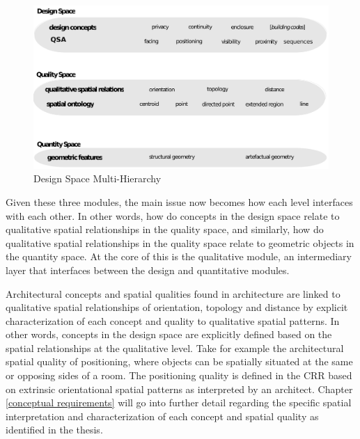 \documentclass[12pt]{ucthesis}
\begin{document}
\begin{figure}[t]
\centering
\includegraphics[width=140mm]{spatial-qualities-hierarchy-nolinks}
\caption{Design Space Multi-Hierarchy}
\label{hierarchy no-links}
\end{figure}

Given these three modules, the main issue now becomes how each level interfaces with each other. In other words, how do concepts in the design space relate to qualitative spatial relationships in the quality space, and similarly, how do qualitative spatial relationships in the quality space relate to geometric objects in the quantity space. At the core of this is the qualitative module, an intermediary layer that interfaces between the design and quantitative modules. 

Architectural concepts and spatial qualities found in architecture are linked to qualitative spatial relationships of orientation, topology and distance by explicit characterization of each concept and quality to qualitative spatial patterns. In other words, concepts in the design space are explicitly defined based on the spatial relationships at the qualitative level. Take for example the architectural spatial quality of positioning, where objects can be spatially situated at the same or opposing sides of a room. The positioning quality is defined in the CRR based on extrinsic orientational spatial patterns as interpreted by an architect. Chapter \ref{conceptual requirements} will go into further detail regarding the specific spatial interpretation and characterization of each concept and spatial quality as identified in the thesis.

\end{document}
